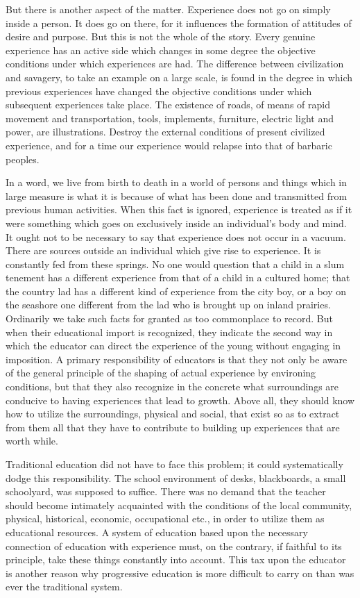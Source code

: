 But there is another aspect of the matter. Experience does not go on simply inside a 
person. It does go on there, for it influences the formation of attitudes of desire and 
purpose. But this is not the whole of the story. Every genuine experience has an active 
side which changes in some degree the objective conditions under which experiences are 
had. The difference between civilization and savagery, to take an example on a large 
scale, is found in the degree in which previous experiences have changed the objective 
conditions under which subsequent experiences take place. The existence of roads, of 
means of rapid movement and transportation, tools, implements, furniture, electric light 
and power, are illustrations. Destroy the external conditions of present civilized 
experience, and for a time our experience would relapse into that of barbaric peoples. 

In a word, we live from birth to death in a world of persons and things which in large 
measure is what it is because of what has been done and transmitted from previous 
human activities. When this fact is ignored, experience is treated as if it were something 
which goes on exclusively inside an individual's body and mind. It ought not to be 
necessary to say that experience does not occur in a vacuum. There are sources outside an 
individual which give rise to experience. It is constantly fed from these springs. No one 
would question that a child in a slum tenement has a different experience from that of a 
child in a cultured home; that the country lad has a different kind of experience from the 
city boy, or a boy on the seashore one different from the lad who is brought up on inland 
prairies. Ordinarily we take such facts for granted as too commonplace to record. But 
when their educational import is recognized, they indicate the second way in which the 
educator can direct the experience of the young without engaging in imposition. A 
primary responsibility of educators is that they not only be aware of the general principle 
of the shaping of actual experience by environing conditions, but that they also recognize 
in the concrete what surroundings are conducive to having experiences that lead to 
growth. Above all, they should know how to utilize the surroundings, physical and social, 
that exist so as to extract from them all that they have to contribute to building up 
experiences that are worth while. 

Traditional education did not have to face this problem; it could systematically dodge 
this responsibility. The school environment of desks, blackboards, a small schoolyard, 
was supposed to suffice. There was no demand that the teacher should become intimately 
acquainted with the conditions of the local community, physical, historical, economic, 
occupational etc., in order to utilize them as educational resources. A system of education 
based upon the necessary connection of education with experience must, on the contrary, 
if faithful to its principle, take these things constantly into account. This tax upon the educator is another reason why progressive education is more difficult to carry on than 
was ever the traditional system. 

